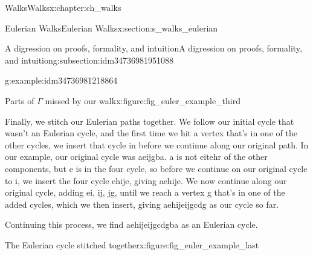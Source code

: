 \documentclass[oneside,10pt,]{book}
\numberwithin{equation}{section}
\begin{document}
\begin{chapterptx}{Walks}{}{Walks}{}{}{x:chapter:ch_walks}
\begin{sectionptx}{Eulerian Walks}{}{Eulerian Walks}{}{}{x:section:s_walks_eulerian}
\begin{subsectionptx}{A digression on proofs, formality, and intuition}{}{A digression on proofs, formality, and intuition}{}{}{g:subsection:idm34736981951088}
\begin{example}{}{g:example:idm34736981218864}
\begin{figureptx}{Parts of \(\Gamma\) missed by our walk}{x:figure:fig_euler_example_third}{}
\begin{image}{0.15}{0.7}{0.15}
{\begin{tikzpicture}[scale=2]
\end{tikzpicture}
}%
\end{image}%
\tcblower
\end{figureptx}%
Finally, we stitch our Eulerian paths together.  We follow our initial cycle that wasn't an Eulerian cycle, and the first time we hit a vertex that's in one of the other cycles, we insert that cycle in before we continue along our original path.  In our example, our original cycle was aeijgba.  a is not eitehr of the other components, but e is in the four cycle, so before we continue on our original cycle to i, we insert the four cycle ehije, giving aehije.  We now continue along our original cycle, adding ei, ij, jg, until we reach a vertex g that's in one of the added cycles, which we then insert, giving aehijeijgcdg as our cycle so far.%
\par
Continuing this process, we find aehijeijgcdgba as an Eulerian cycle.%
\begin{figureptx}{The Eulerian cycle stitched together}{x:figure:fig_euler_example_last}{}%
\begin{image}{0.15}{0.7}{0.15}%
\end{image}
\end{figureptx}
\end{example}
\end{subsectionptx}
\end{sectionptx}
\end{chapterptx}
\end{document}

